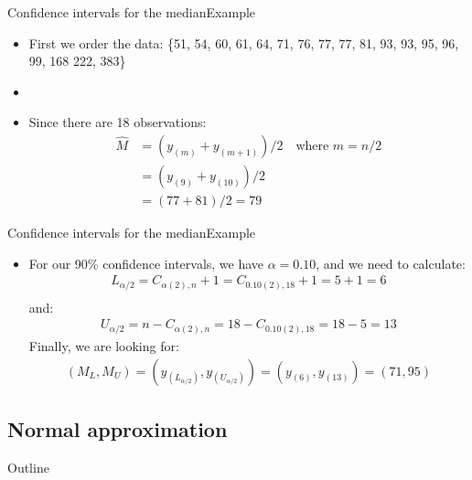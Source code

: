 \documentclass[xcolor=dvipsnames]{beamer}
\begin{document}
\begin{frame}{Confidence intervals for the median}{Example}
\begin{itemize}
	\item First we order the data: \{51, 54, 60, 61, 64, 71, 76, 77, 77, 81, 93, 93, 95, 96, 99, 168 222, 383\} \pause
	\item[]
	\item Since there are 18 observations: \pause
	\begin{align*}
		\hat{M} &= (y_{(m)} + y_{(m+1)})/2 \quad \text{where } m = n/2 \\
		&=(y_{(9)} + y_{(10)})/2 \\
		&= (77 + 81)/2 = 79
	\end{align*}
\end{itemize}
\end{frame}

\begin{frame}{Confidence intervals for the median}{Example}
\begin{itemize}
	\item For our 90\% confidence intervals, we have $\alpha = 0.10$, and we need to calculate:
	\begin{align*}
		L_{\alpha /2} = C_{\alpha (2), n} +1 = C_{0.10(2), 18} +1 = 5+1=6 \\
	\end{align*} 
	and:
	\begin{align*}
		U_{\alpha /2} = n- C_{\alpha (2), n} = 18 - C_{0.10(2), 18} = 18-5 = 13
	\end{align*}\pause
	Finally, we are looking for:
	\begin{align*}
		(M_L, M_U) = (y_{(L_{\alpha / 2})}, y_{(U_{\alpha/2})}) = (y_{(6)}, y_{(13)}) = (71, 95)
	\end{align*}
\end{itemize}
\end{frame}

\subsection{Normal approximation}
\begin{frame}{Outline}
\tableofcontents[currentsection,subsectionstyle=show/shaded/hide]
\end{frame}
\end{document}
